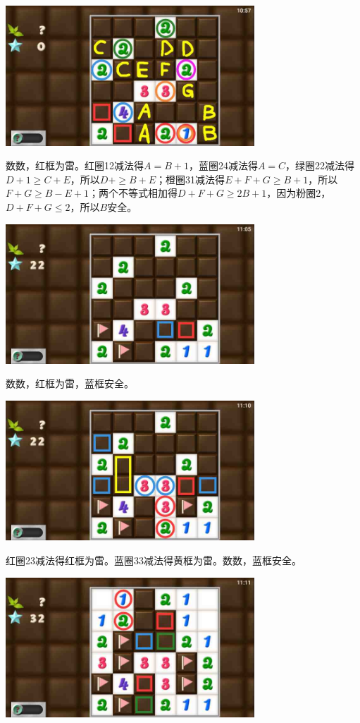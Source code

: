 \subsection{} %
\begin{center}
    \includegraphics[width=0.7\textwidth]{puzzlelow/223-1.jpg}
\end{center}
数数，红框为雷。红圈12减法得$A=B+1$，蓝圈24减法得$A=C$，绿圈22减法得$D+1\ge C+E$，所以$D+\ge B+E$；橙圈31减法得$E+F+G\ge B+1$，所以$F+G\ge B-E+1$；两个不等式相加得$D+F+G\ge 2B+1$，因为粉圈2，$D+F+G\le 2$，所以$B$安全。
\begin{center}
    \includegraphics[width=0.7\textwidth]{puzzlelow/223-2.jpg}
\end{center}
数数，红框为雷，蓝框安全。
\begin{center}
    \includegraphics[width=0.7\textwidth]{puzzlelow/223-3.jpg}
\end{center}
红圈23减法得红框为雷。蓝圈33减法得黄框为雷。数数，蓝框安全。
\begin{center}
    \includegraphics[width=0.7\textwidth]{puzzlelow/223-4.jpg}
\end{center}
